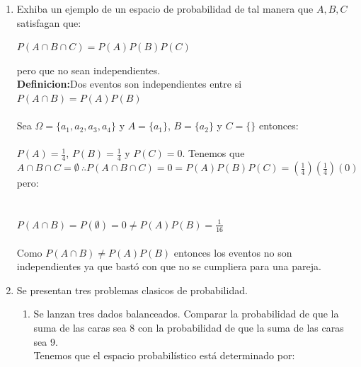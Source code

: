 \documentclass[12pt,a4paper]{report}
\begin{document}
\begin{enumerate}
   \item {
  Exhiba un ejemplo de un espacio de probabilidad de tal manera que $A,B,C$ satisfagan que: \\
  \begin{center}
  $P(A\cap B \cap C) = P(A)P(B)P(C)$
  \end{center}
  pero que no sean independientes.\\
  \textbf{Definicion:}Dos eventos son independientes entre si $P(A\cap B)=P(A)P(B)$\\ \\
  Sea $\Omega = \lbrace a_{1},a_{2},a_{3},a_{4} \rbrace$
  y $A = \lbrace a_{1} \rbrace$, $B= \lbrace a_{2} \rbrace$ y $C=\lbrace \rbrace$ entonces:\\ \\
  $P(A)=\frac{1}{4}$, $P(B)=\frac{1}{4}$ y $P(C)=0$. Tenemos que $A\cap B \cap C = \emptyset \ \therefore P(A\cap B \cap C)=0=P(A)P(B)P(C)=(\frac{1}{4})(\frac{1}{4})(0)$ pero:\\ \\ \\
  $P(A\cap B)=P(\emptyset)=0 \neq P(A)P(B)= \frac{1}{16}$ \\ \\
 Como $P(A \cap B)\neq P(A) P(B)$ entonces los eventos no son independientes ya que bastó con que no se cumpliera para una pareja.
  }

   \item {
    Se presentan tres problemas clasicos de probabilidad.

    \begin{enumerate}[label=\alph*) ]
    \item{Se lanzan tres dados balanceados. Comparar la probabilidad de que la suma de las caras sea 8 con la probabilidad de que la suma de las caras sea 9.
    \\
    Tenemos que el espacio probabilístico está determinado por:\\

}
\end{enumerate}}
\end{enumerate}
\end{document}
